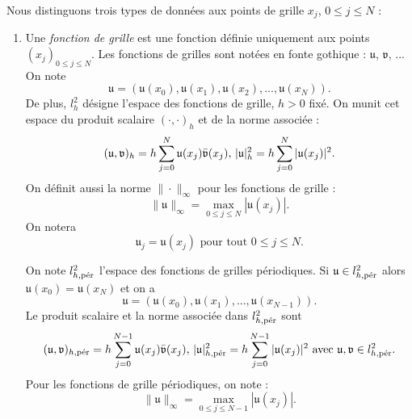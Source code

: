 Nous distinguons trois types de données aux points de grille $x_j$, $0 \leq j \leq N$ :
\begin{enumerate}
\item Une \textit{fonction de grille} est une fonction définie uniquement aux points $(x_j)_{0 \leq j \leq N}$. Les fonctions de grilles sont notées en fonte gothique : $\mathfrak{u}$, $\mathfrak{v}$, ... 
On note
\begin{equation}
\mathfrak{u} = (\mathfrak{u}(x_0), \mathfrak{u}(x_1), \mathfrak{u}(x_2), ... , \mathfrak{u}(x_N)).
\end{equation}
De plus, $l^2_h$ désigne l'espace des fonctions de grille, $h>0$ fixé.
On munit cet espace du produit scalaire $(\cdot, \cdot)_{h}$ et de la norme associée :
\begin{equation}
(\mathfrak{u},\mathfrak{v})_h = h \gsum_{j=0}^N \mathfrak{u}(x_j) \bar{\mathfrak{v}}(x_j) \text{,  } |\mathfrak{u}|_h^2 = h \gsum_{j=0}^N |\mathfrak{u}(x_j)|^2.
\end{equation}
On définit aussi la norme $\| \cdot \|_{\infty}$ pour les fonctions de grille :
\begin{equation}
\| \mathfrak{u} \|_{\infty} = \max_{0\leq j \leq N} |\mathfrak{u}(x_j)|.
\end{equation}
On notera 
\begin{equation}
\mathfrak{u}_j = \mathfrak{u}(x_j) \text{ pour tout } 0\leq j \leq N.  
\end{equation}

On note $l^2_{h,\per}$ l'espace des fonctions de grilles périodiques. Si $\mathfrak{u} \in l^2_{h,\per}$ alors $\mathfrak{u}(x_0) = \mathfrak{u}(x_N)$ et on a
\begin{equation}
\mathfrak{u}=(\mathfrak{u}(x_0), \mathfrak{u}(x_1), ..., \mathfrak{u}(x_{N-1})).
\end{equation}
Le produit scalaire et la norme associée dans $l^2_{h,\per}$ sont
\begin{equation}
(\mathfrak{u},\mathfrak{v})_{h,\per} = h \gsum_{j=0}^{N-1} \mathfrak{u}(x_j) \bar{\mathfrak{v}}(x_j) \text{,  } |\mathfrak{u}|_{h,\per}^2 = h \gsum_{j=0}^{N-1} |\mathfrak{u}(x_j)|^2 \text{ avec } \mathfrak{u}, \mathfrak{v} \in l^2_{h,\per}.
\end{equation}
Pour les fonctions de grille périodiques, on note :
\begin{equation}
\| \mathfrak{u} \|_{\infty} = \max_{0\leq j \leq N-1} |\mathfrak{u}(x_j)|.
\end{equation}




\end{enumerate}
